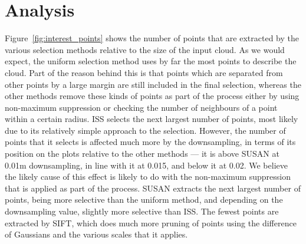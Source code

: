\documentclass[11pt,a4paper]{kth-mag}
\begin{document}
\section{Analysis}
Figure~\ref{fig:interest_points} shows the number of points that are extracted
by the various selection methods relative to the size of the input cloud. As we
would expect, the uniform selection method uses by far the most points to
describe the cloud. Part of the reason behind this is that points which are
separated from other points by a large margin are still included in the final
selection, whereas the other methods remove these kinds of points as part of the
process either by using non-maximum suppression or checking the number of
neighbours of a point within a certain radius. ISS selects the next largest
number of points, most likely due to its relatively simple approach to the
selection. However, the number of points that it selects is affected much more
by the downsampling, in terms of its position on the plots relative to the other
methods --- it is above SUSAN at 0.01m downsampling, in line with it at 0.015,
and below it at 0.02. We believe the likely cause of this effect is likely to do
with the non-maximum suppression that is applied as part of the process. SUSAN
extracts the next largest number of points, being more selective than the
uniform method, and depending on the downsampling value, slightly more selective
than ISS. The fewest points are extracted by SIFT, which does much more pruning
of points using the difference of Gaussians and the various scales that it
applies.
\end{document}
